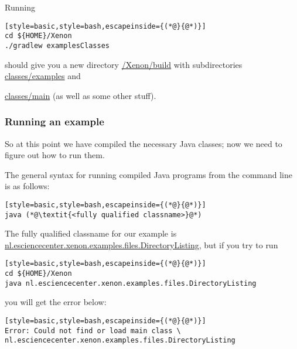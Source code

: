 Running
\begin{lstlisting}[style=basic,style=bash,escapeinside={(*@}{@*)}]
cd ${HOME}/Xenon
./gradlew examplesClasses
\end{lstlisting} %
should give you a new directory \mytilde\url{/Xenon/build} with subdirectories \url{classes/examples} and {\url{classes/main} (as well as some other stuff).


\subsubsection{Running an example}

So at this point we have compiled the necessary Java classes; now we need to figure out how to run them.

The general syntax for running compiled Java programs from the command line is as follows:
\begin{lstlisting}[style=basic,style=bash,escapeinside={(*@}{@*)}]
java (*@\textit{<fully qualified classname>}@*)
\end{lstlisting}
The fully qualified classname for our example is \url{nl.esciencecenter.xenon.examples.files.DirectoryListing}, but if you try to run
\begin{lstlisting}[style=basic,style=bash,escapeinside={(*@}{@*)}]
cd ${HOME}/Xenon
java nl.esciencecenter.xenon.examples.files.DirectoryListing
\end{lstlisting} %
you will get the error below:
\begin{lstlisting}[style=basic,style=bash,escapeinside={(*@}{@*)}]
Error: Could not find or load main class \
nl.esciencecenter.xenon.examples.files.DirectoryListing
\end{lstlisting}

}
